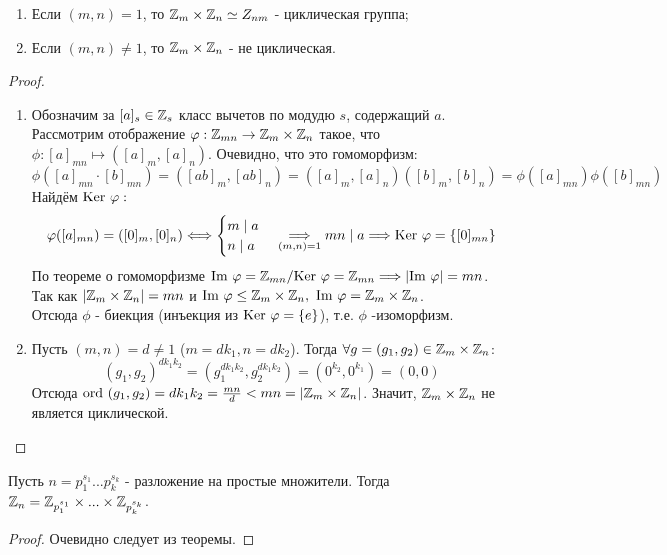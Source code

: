 \begin{subtheorem}\tab
    \begin{enumerate}
        \item Если $(m, n) = 1$, то $\Z_m \times \Z_n \simeq Z_{nm}$ - циклическая группа;
        \item Если $(m, n) \neq 1$, то $\Z_m \times \Z_n$ - не циклическая.
    \end{enumerate}
\end{subtheorem}
\begin{proof}\tab
    \begin{enumerate}
        \item Обозначим за $[a]_s \in \Z_s$ класс вычетов по модудю $s$, содержащий $a$.\\
        Рассмотрим отображение $\phi: \Z_{mn} \rightarrow \Z_m \times \Z_n$ такое, что $\phi: [a]_{mn} \mapsto ([a]_m, [a]_n)$. Очевидно, что это гомоморфизм: 
        \[\phi([a]_{mn} \cdot [b]_{mn}) = ([ab]_m, [ab]_n) = ([a]_m, [a]_n)([b]_m, [b]_n) = \phi([a]_{mn})\phi([b]_{mn})\]
        Найдём $\textup{Ker }\phi:$
        \[\phi([a]_{mn}) = ([0]_m, [0]_n) \Longleftrightarrow \begin{cases}m \mid a\\ n\mid a \end{cases} \underset{(m,n)=1}{\Longrightarrow} mn \mid a \Longrightarrow \textup{Ker }\phi = \{[0]_{mn}\}\]
        По теореме о гомоморфизме $\textup{Im }\phi = \Z_{mn} / \textup{Ker }\phi = \Z_{mn} \Longrightarrow |\textup{Im } \phi| = mn$. Так как $|\Z_m \times \Z_n| = mn$ и $\textup{Im }\phi \leq \Z_m \times \Z_n, \ \textup{Im }\phi = \Z_m \times \Z_n$.\\
        Отсюда $\phi$ - биекция (инъекция из $\textup{Ker }\phi = \{e\}$), т.е. $\phi$  -изоморфизм.
        \item Пусть $(m,n) = d \neq 1$ ($m = dk_1, n = dk_2$). Тогда $\forall g = (g_1, g_2) \in \Z_m \times \Z_n$:
        \[(g_1, g_2)^{dk_1k_2} = (g_1^{dk_1k_2}, g_2^{dk_1k_2}) = (0^{k_2}, 0^{k_1}) = (0, 0)\]
        Отсюда $\textup{ord } (g_1, g_2) = dk_1k_2 = \frac{mn}{d} < mn = |\Z_m \times \Z_n|$. Значит, $\Z_m \times \Z_n$ не является циклической.
    \end{enumerate}
\end{proof}
\begin{consequense}
    Пусть $n = p_1^{s_1}...p_k^{s_k}$ - разложение на простые множители. Тогда $\Z_n = \Z_{p_1^{s_1}}\times ...\times \Z_{p_k^{s_k}}$.
\end{consequense}
\begin{proof}
    Очевидно следует из теоремы.
\end{proof}
